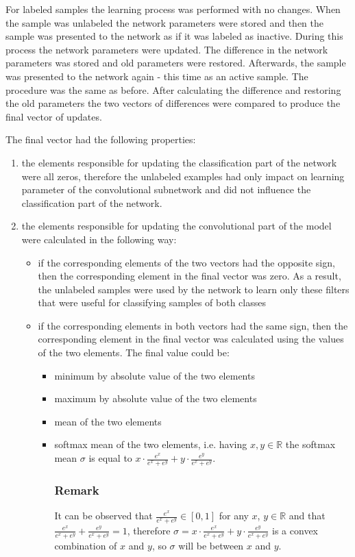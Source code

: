 \documentclass[a4paper,10pt]{report}
\begin{document}
      For labeled samples the learning process was performed with no changes. When the sample was unlabeled the network parameters were stored and then the sample was presented to the network as if it was labeled as inactive. During this process the network parameters were updated. The difference in the network parameters was stored and old parameters were restored. Afterwards, the sample was presented to the network again - this time as an active sample. The procedure was the same as before. After calculating the difference and restoring the old parameters the two vectors of differences were compared to produce the final vector of updates. 
           
           
      The final vector had the following properties:
      \begin{enumerate}
       \item the elements responsible for updating the classification part of the network were all zeros, therefore the unlabeled examples had only impact on learning parameter of the convolutional subnetwork and did not influence the classification part of the network. 
       \item the elements responsible for updating the convolutional part of the model were calculated in the following way:
	\begin{itemize}
	 \item if the corresponding elements of the two vectors had the opposite sign, then the corresponding element in the final vector was zero. As a result, the unlabeled samples were used by the network to learn only these filters that were useful for classifying samples of both classes
	  \item if the corresponding elements in both vectors had the same sign, then the corresponding element in the final vector was calculated using the values of the two elements. The final value could be:
	  \begin{itemize}
	    \item minimum by absolute value of the two elements
	    \item maximum by absolute value of the two elements
	    \item mean of the two elements
	    \item softmax mean of the two elements, i.e. having $x, y \in \mathbb{R}$ the softmax mean $\sigma$ is equal to $x \cdot \frac{e^x}{e^x + e^y} + y \cdot \frac{e^y}{e^x + e^y}$.
	    
	    \subsubsection{Remark}
	      It can be observed that $\frac{e^x}{e^x + e^y} \in [0, 1]$ for any $x$, $y \in \mathbb{R}$ and that $\frac{e^x}{e^x + e^y} + \frac{e^y}{e^x + e^y} = 1$, therefore $\sigma = x \cdot \frac{e^x}{e^x + e^y} + y \cdot \frac{e^y}{e^x + e^y}$ is a convex combination of $x$ and $y$, so $\sigma$ will be between $x$ and $y$. 
	  \end{itemize}
	\end{itemize}
      \end{enumerate}
\end{document}
